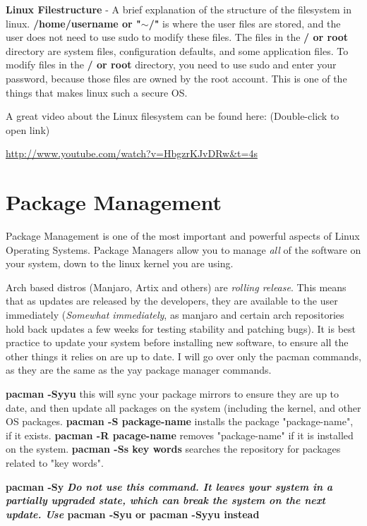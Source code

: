 \documentclass[12pt, letterpaper, twoside]{article}
\begin{document}
\textbf{Linux Filestructure} - A brief explanation of the structure of the filesystem in linux. \textbf{/home/username or "$\mathtt{\sim}$/"} is where the user files are stored, and the user does not need to use sudo to modify these files. The files in the \textbf{/ or root} directory are system files, configuration defaults, and some application files. To modify files in the \textbf{/ or root} directory, you need to use sudo and enter your password, because those files are owned by the root account. This is one of the things that makes linux such a secure OS.

A great video about the Linux filesystem can be found here: 
(Double-click to open link)

\url{http://www.youtube.com/watch?v=HbgzrKJvDRw&t=4s}

\section{Package Management}

Package Management is one of the most important and powerful aspects of Linux Operating Systems. Package Managers allow you to manage \textit{all} of the software on your system, down to the linux kernel you are using. 

Arch based distros (Manjaro, Artix and others) are \textit{rolling release}. This means that as updates are released by the developers, they are available to the user immediately (\textit{Somewhat immediately}, as manjaro and certain arch repositories hold back updates a few weeks for testing stability and patching bugs). It is best practice to update your system before installing new software, to ensure all the other things it relies on are up to date. I will go over only the pacman commands, as they are the same as the yay package manager commands.

\textbf{pacman -Syyu} this will sync your package mirrors to ensure they are up to date, and then update all packages on the system (including the kernel, and other OS packages. \textbf{pacman -S package-name} installs the package "package-name", if it exists. \textbf{pacman -R pacage-name} removes "package-name" if it is installed on the system. \textbf{pacman -Ss key words} searches the repository for packages related to "key words".

\textbf{pacman -Sy} \textbf{\textit{Do not use this command. It leaves your system in a partially upgraded state, which can break the system on the next update. Use }pacman -Syu or pacman -Syyu instead}
\end{document}

